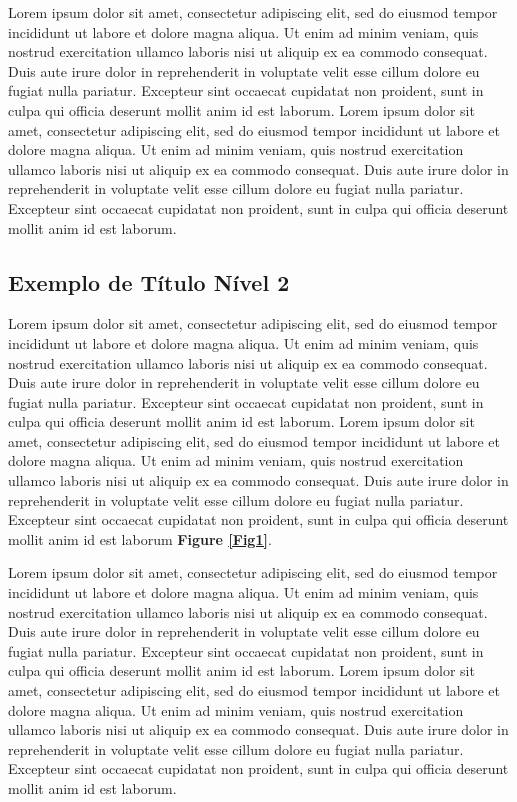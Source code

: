 Lorem ipsum dolor sit amet, consectetur adipiscing elit, sed do eiusmod tempor incididunt ut labore et dolore magna aliqua. Ut enim ad minim veniam, quis nostrud exercitation ullamco laboris nisi ut aliquip ex ea commodo consequat. Duis aute irure dolor in reprehenderit in voluptate velit esse cillum dolore eu fugiat nulla pariatur. Excepteur sint occaecat cupidatat non proident, sunt in culpa qui officia deserunt mollit anim id est laborum. Lorem ipsum dolor sit amet, consectetur adipiscing elit, sed do eiusmod tempor incididunt ut labore et dolore magna aliqua. Ut enim ad minim veniam, quis nostrud exercitation ullamco laboris nisi ut aliquip ex ea commodo consequat. Duis aute irure dolor in reprehenderit in voluptate velit esse cillum dolore eu fugiat nulla pariatur. Excepteur sint occaecat cupidatat non proident, sunt in culpa qui officia deserunt mollit anim id est laborum.


\subsection{Exemplo de Título Nível 2}

Lorem ipsum dolor sit amet, consectetur adipiscing elit, sed do eiusmod tempor incididunt ut labore et dolore magna aliqua. Ut enim ad minim veniam, quis nostrud exercitation ullamco laboris nisi ut aliquip ex ea commodo consequat. Duis aute irure dolor in reprehenderit in voluptate velit esse cillum dolore eu fugiat nulla pariatur. Excepteur sint occaecat cupidatat non proident, sunt in culpa qui officia deserunt mollit anim id est laborum. Lorem ipsum dolor sit amet, consectetur adipiscing elit, sed do eiusmod tempor incididunt ut labore et dolore magna aliqua. Ut enim ad minim veniam, quis nostrud exercitation ullamco laboris nisi ut aliquip ex ea commodo consequat. Duis aute irure dolor in reprehenderit in voluptate velit esse cillum dolore eu fugiat nulla pariatur. Excepteur sint occaecat cupidatat non proident, sunt in culpa qui officia deserunt mollit anim id est laborum \textbf{Figure \ref{Fig1}}.

Lorem ipsum dolor sit amet, consectetur adipiscing elit, sed do eiusmod tempor incididunt ut labore et dolore magna aliqua. Ut enim ad minim veniam, quis nostrud exercitation ullamco laboris nisi ut aliquip ex ea commodo consequat. Duis aute irure dolor in reprehenderit in voluptate velit esse cillum dolore eu fugiat nulla pariatur. Excepteur sint occaecat cupidatat non proident, sunt in culpa qui officia deserunt mollit anim id est laborum. Lorem ipsum dolor sit amet, consectetur adipiscing elit, sed do eiusmod tempor incididunt ut labore et dolore magna aliqua. Ut enim ad minim veniam, quis nostrud exercitation ullamco laboris nisi ut aliquip ex ea commodo consequat. Duis aute irure dolor in reprehenderit in voluptate velit esse cillum dolore eu fugiat nulla pariatur. Excepteur sint occaecat cupidatat non proident, sunt in culpa qui officia deserunt mollit anim id est laborum.


